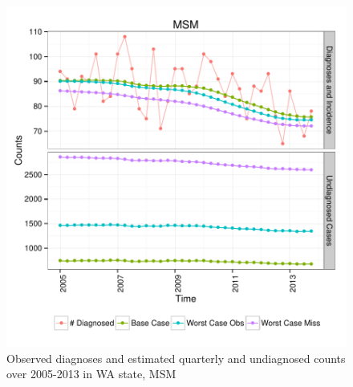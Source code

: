 \documentclass{article}\usepackage[]{graphicx}\usepackage[]{color}
\makeatletter
\def\maxwidth{ %
  \ifdim\Gin@nat@width>\linewidth
    \linewidth
  \else
    \Gin@nat@width
  \fi
}
\newenvironment{knitrout}{}{} %
\makeatother
\begin{document}
\begin{knitrout}\footnotesize
{}\color{fgcolor}\begin{figure}[]


{\centering \includegraphics[width=\maxwidth]{figure/minimal-plot_subgroup_MSM} 

}

\caption[Observed diagnoses and estimated quarterly and undiagnosed counts over 2005-2013 in WA state, MSM]{Observed diagnoses and estimated quarterly and undiagnosed counts over 2005-2013 in WA state, MSM\label{fig:plot_subgroup_MSM}}
\end{figure}


\end{knitrout}
\end{document}
